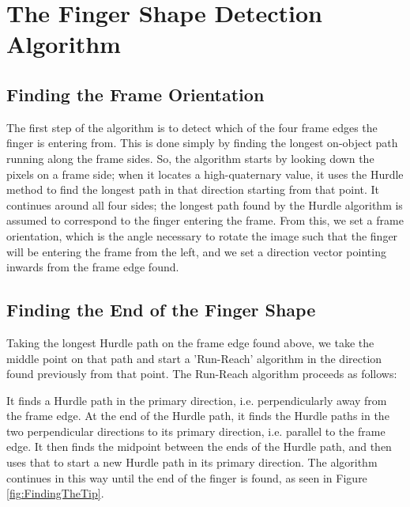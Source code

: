 \section{The Finger Shape Detection Algorithm}\label{sec:FingerShapeDetectionAlgorithm}


\subsection{Finding the Frame Orientation}\label{sec:FindingTheFrameOrientation}
The first step of the algorithm is to detect which of the four frame edges the finger is entering from. This is done simply by finding the longest on-object path running along the frame sides. So, the algorithm starts by looking down the pixels on a frame side; when it locates a high-quaternary value, it uses the Hurdle method to find the longest path in that direction starting from that point. It continues around all four sides; the longest path found by the Hurdle algorithm is assumed to correspond to the finger entering the frame. From this, we set a frame orientation, which is the angle necessary to rotate the image such that the finger will be entering the frame from the left, and we set a direction vector pointing inwards from the frame edge found.

\subsection{Finding the End of the Finger Shape}\label{sec:FindingTheEndOfTheFingerShape}
Taking the longest Hurdle path on the frame edge found above, we take the middle point on that path and start a 'Run-Reach' algorithm in the direction found previously from that point. The Run-Reach algorithm proceeds as follows:

It finds a Hurdle path in the primary direction, i.e. perpendicularly away from the frame edge. At the end of the Hurdle path, it finds the Hurdle paths in the two perpendicular directions to its primary direction, i.e. parallel to the frame edge. It then finds the midpoint between the ends of the Hurdle path, and then uses that to start a new Hurdle path in its primary direction. The algorithm continues in this way until the end of the finger is found, as seen in Figure \ref{fig:FindingTheTip}.

